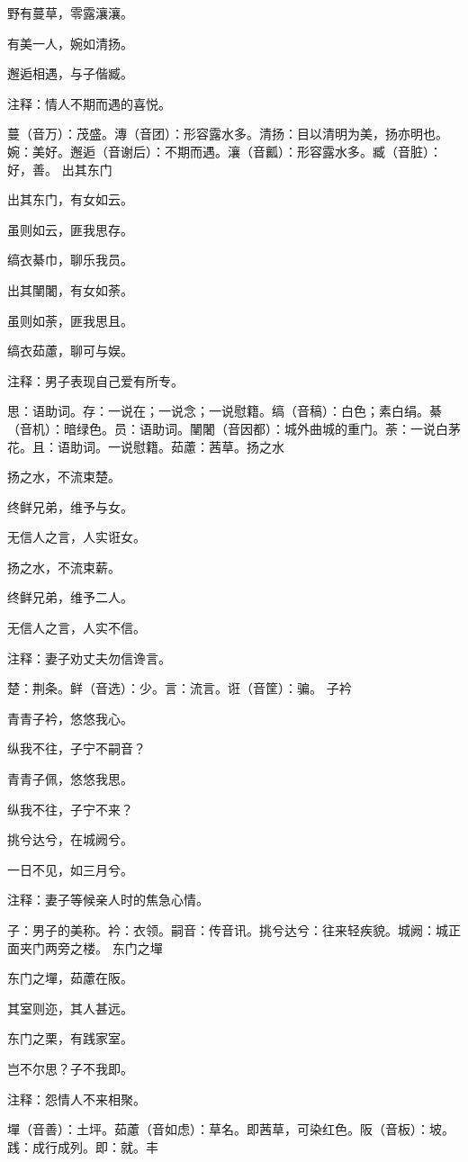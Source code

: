 \documentclass[12pt,UTF8]{ctexbook}
\begin{document}
野有蔓草，零露瀼瀼。

有美一人，婉如清扬。

邂逅相遇，与子偕臧。

注释：情人不期而遇的喜悦。

蔓（音万）：茂盛。漙（音团）：形容露水多。清扬：目以清明为美，扬亦明也。婉：美好。邂逅（音谢后）：不期而遇。瀼（音瓤）：形容露水多。臧（音脏）：好，善。 出其东门

出其东门，有女如云。

虽则如云，匪我思存。

缟衣綦巾，聊乐我员。

出其闉闍，有女如荼。

虽则如荼，匪我思且。

缟衣茹藘，聊可与娱。

注释：男子表现自己爱有所专。

思：语助词。存：一说在；一说念；一说慰籍。缟（音稿）：白色；素白绢。綦（音机）：暗绿色。员：语助词。闉闍（音因都）：城外曲城的重门。荼：一说白茅花。且：语助词。一说慰籍。茹藘：茜草。扬之水

扬之水，不流束楚。

终鲜兄弟，维予与女。

无信人之言，人实诳女。

扬之水，不流束薪。

终鲜兄弟，维予二人。

无信人之言，人实不信。

注释：妻子劝丈夫勿信谗言。

楚：荆条。鲜（音选）：少。言：流言。诳（音筐）：骗。 子衿

青青子衿，悠悠我心。

纵我不往，子宁不嗣音？

青青子佩，悠悠我思。

纵我不往，子宁不来？

挑兮达兮，在城阙兮。

一日不见，如三月兮。

注释：妻子等候亲人时的焦急心情。

子：男子的美称。衿：衣领。嗣音：传音讯。挑兮达兮：往来轻疾貌。城阙：城正面夹门两旁之楼。 东门之墠

东门之墠，茹藘在阪。

其室则迩，其人甚远。

东门之栗，有践家室。

岂不尔思？子不我即。

注释：怨情人不来相聚。

墠（音善）：土坪。茹藘（音如虑）：草名。即茜草，可染红色。阪（音板）：坡。践：成行成列。即：就。丰
\end{document}
